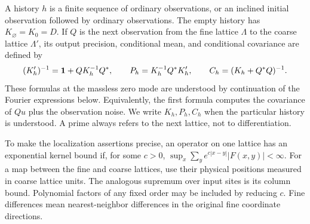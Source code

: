 A history $h$ is a finite sequence of ordinary observations,
or an inclined initial observation followed by ordinary observations.
The empty history has $K_{\varnothing}=K_0=D$.  If $Q$ is the next
observation from the fine lattice $\Lambda$ to the coarse lattice $\Lambda'$, its output precision, conditional mean, and conditional
covariance are defined by
\begin{equation}
 (K_{h}')^{-1}
 =\mathbf 1+QK_{h}^{-1}Q^*,\qquad
 P_{h}=K_{h}^{-1}Q^*K_{h}',\qquad
 C_{h}=(K_{h}+Q^*Q)^{-1}.
 \label{eq:free-operators}
\end{equation}
These formulas at the massless zero mode are understood by continuation
of the Fourier expressions below.  Equivalently, the first formula
computes the covariance of $Qu$ plus the observation noise.  We write
$K_h,P_h,C_h$ when the particular history is understood.  A prime always
refers to the next lattice, not to differentiation.

To make the localization assertions precise, an operator on one lattice
has an exponential kernel bound if, for some $c>0$,
$\sup_x\sum_y e^{c|x-y|}|F(x,y)|<\infty$.
For a map between the fine and coarse lattices, use their physical
positions measured in coarse lattice units.  The analogous supremum
over input sites is its column bound.  Polynomial factors of any fixed
order may be included by reducing $c$.  Fine differences mean
nearest-neighbor differences in the original fine coordinate directions.

